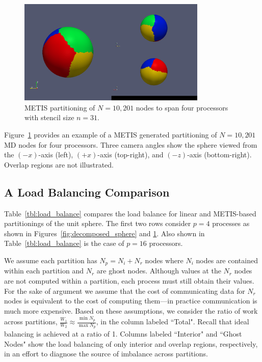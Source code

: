 \documentclass{report}
\begin{document}
\begin{figure}
\begin{center}
\includegraphics[width=0.8\textwidth]{rbffd_methods_content/decompositions/gpmetis_decomp_sphere_4parts.png}
\caption{METIS partitioning of $N=10,201$ nodes to span four processors with stencil size $n=31$. }
\label{fig:metis_decomposed_sphere}
\end{center}
\end{figure}

Figure~\ref{fig:metis_decomposed_sphere} provides an example of a METIS generated partitioning of $N=10,201$ MD nodes for four processors. Three camera angles show the sphere viewed from the $(-x)$-axis (left), $(+x)$-axis (top-right), and $(-z)$-axis (bottom-right). Overlap regions are not illustrated.

\subsection{A Load Balancing Comparison}
\label{sec:load_balance}

Table~\ref{tbl:load_balance} compares the load balance for linear and METIS-based partitionings of the unit sphere. The first two rows consider $p=4$ processes as shown in Figures~\ref{fig:decomposed_sphere} and \ref{fig:metis_decomposed_sphere}. Also shown in Table~\ref{tbl:load_balance} is the case of $p=16$ processors. 

We assume each partition has $N_p = N_i + N_r$ nodes where $N_i$ nodes are contained within each partition and $N_r$ are ghost nodes. Although values at the $N_r$ nodes are not computed within a partition, each process must still obtain their values. For the sake of argument we assume that the cost of communicating data for $N_r$ nodes is equivalent to the cost of computing them---in practice communication is much more expensive. Based on these assumptions, we consider the ratio of work across partitions, $\frac{W_1}{W_2} \approx \frac{\min N_p}{\max N_p}$, in the column labeled ``Total". Recall that ideal balancing is achieved at a ratio of 1. Columns labeled ``Interior" and ``Ghost Nodes" show the load balancing of only interior and overlap regions, respectively, in an effort to diagnose the source of imbalance across partitions. 
\end{document}
